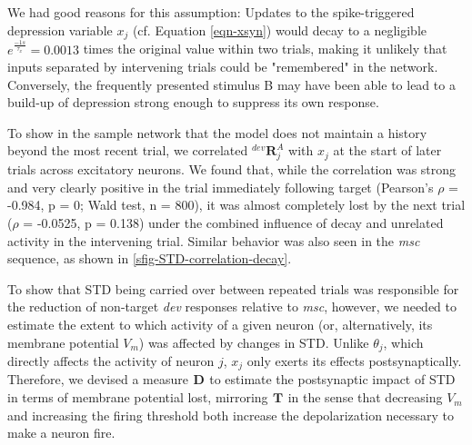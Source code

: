 \documentclass[pdflatex,referee,iicol,sn-basic]{sn-jnl}
\newcommand{\dev}{\textit{dev}}
\newcommand{\msc}{\textit{msc}}
\renewcommand{\R}[3][]{{}^{#1}_{}\mathbf{R}^{#2}_{#3}}
\renewcommand{\T}[3][]{{}^{#1}_{}\mathbf{T}^{#2}_{#3}}
\newcommand{\D}[3][]{{}^{#1}_{}\mathbf{D}^{#2}_{#3}}
\begin{document}
We had good reasons for this assumption: Updates to the spike-triggered depression variable $x_j$ (cf. Equation \ref{eqn-xsyn}) would decay to a negligible $e^\frac{-1 s}{\tau_x} = 0.0013$ times the original value within two trials, making it unlikely that inputs separated by intervening trials could be "remembered" in the network. Conversely, the frequently presented stimulus B may have been able to lead to a build-up of depression strong enough to suppress its own response.

To show in the sample network that the model does not maintain a history beyond the most recent trial, we correlated $\R[dev]{A}{j}$ with $x_j$ at the start of later trials across excitatory neurons. We found that, while the correlation was strong and very clearly positive in the trial immediately following target (Pearson's $\rho$ = -0.984, p = 0; Wald test, n = 800), it was almost completely lost by the next trial ($\rho$ = -0.0525, p = 0.138) under the combined influence of decay and unrelated activity in the intervening trial. Similar behavior was also seen in the \msc{} sequence, as shown in \ref{sfig-STD-correlation-decay}.

To show that STD being carried over between repeated trials was responsible for the reduction of non-target \dev{} responses relative to \msc{}, however, we needed to estimate the extent to which activity of a given neuron (or, alternatively, its membrane potential $V_m$) was affected by changes in STD. Unlike $\theta_j$, which directly affects the activity of neuron $j$, $x_j$ only exerts its effects postsynaptically. Therefore, we devised a measure $\D{}{}$ to estimate the postsynaptic impact of STD in terms of membrane potential lost, mirroring $\T{}{}$ in the sense that decreasing $V_m$ and increasing the firing threshold both increase the depolarization necessary to make a neuron fire.
\end{document}
